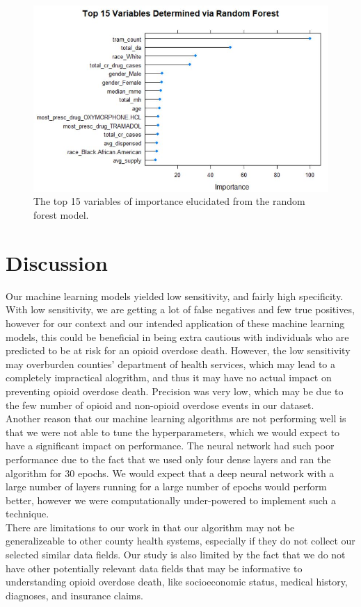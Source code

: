 \documentclass[twoside,10.5pt]{article}
\begin{document}
\begin{figure}[h!]
\centering
\includegraphics[width=12cm]{images/variable_importance.JPG}
\caption{The top 15 variables of importance elucidated from the random forest model.}
\label{fig:var_importance}
\end{figure}



\section{Discussion}
Our machine learning models yielded low sensitivity, and fairly high specificity. With low sensitivity, we are getting a lot of false negatives and few true positives, however for our context and our intended application of these machine learning models, this could be beneficial in being extra cautious with individuals who are predicted to be at risk for an opioid overdose death. However, the low sensitivity may overburden counties' department of health services, which may lead to a completely impractical alogrithm, and thus it may have no actual impact on preventing opioid overdose death. Precision was very low, which may be due to the few number of opioid and non-opioid overdose events in our dataset.\\ 
Another reason that our machine learning algorithms are not performing well is that we were not able to tune the hyperparameters, which we would expect to have a significant impact on performance. The neural network had such poor performance due to the fact that we used only four dense layers and ran the algorithm for 30 epochs. We would expect that a deep neural network with a large number of layers running for a large number of epochs would perform better, however we were computationally under-powered to implement such a technique. \\
There are limitations to our work in that our algorithm may not be generalizeable to other county health systems, especially if they do not collect our selected similar data fields. Our study is also limited by the fact that we do not have other potentially relevant data fields that may be informative to understanding opioid overdose death, like socioeconomic status, medical history, diagnoses, and insurance claims. \\
\end{document}
